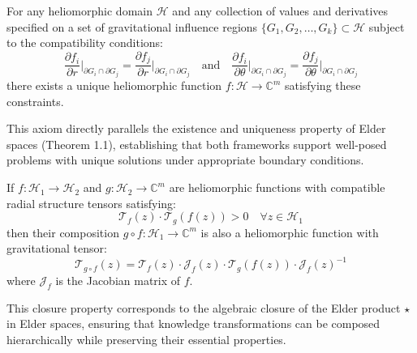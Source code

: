 \begin{axiom}
For any heliomorphic domain $\mathcal{H}$ and any collection of values and derivatives specified on a set of gravitational influence regions $\{G_1, G_2, \ldots, G_k\} \subset \mathcal{H}$ subject to the compatibility conditions:
\begin{equation}
\frac{\partial f_i}{\partial r}\Big|_{\partial G_i \cap \partial G_j} = \frac{\partial f_j}{\partial r}\Big|_{\partial G_i \cap \partial G_j} \quad \text{and} \quad 
\frac{\partial f_i}{\partial \theta}\Big|_{\partial G_i \cap \partial G_j} = \frac{\partial f_j}{\partial \theta}\Big|_{\partial G_i \cap \partial G_j}
\end{equation}
there exists a unique heliomorphic function $f: \mathcal{H} \rightarrow \mathbb{C}^m$ satisfying these constraints.
\end{axiom}

\begin{remark}
This axiom directly parallels the existence and uniqueness property of Elder spaces (Theorem 1.1), establishing that both frameworks support well-posed problems with unique solutions under appropriate boundary conditions.
\end{remark}

\begin{axiom}
If $f: \mathcal{H}_1 \rightarrow \mathcal{H}_2$ and $g: \mathcal{H}_2 \rightarrow \mathbb{C}^m$ are heliomorphic functions with compatible radial structure tensors satisfying:
\begin{equation}
\mathcal{T}_f(z) \cdot \mathcal{T}_g(f(z)) > 0 \quad \forall z \in \mathcal{H}_1
\end{equation}
then their composition $g \circ f: \mathcal{H}_1 \rightarrow \mathbb{C}^m$ is also a heliomorphic function with gravitational tensor:
\begin{equation}
\mathcal{T}_{g \circ f}(z) = \mathcal{T}_f(z) \cdot \mathcal{J}_f(z) \cdot \mathcal{T}_g(f(z)) \cdot \mathcal{J}_f(z)^{-1}
\end{equation}
where $\mathcal{J}_f$ is the Jacobian matrix of $f$.
\end{axiom}

\begin{remark}
This closure property corresponds to the algebraic closure of the Elder product $\star$ in Elder spaces, ensuring that knowledge transformations can be composed hierarchically while preserving their essential properties.
\end{remark}

